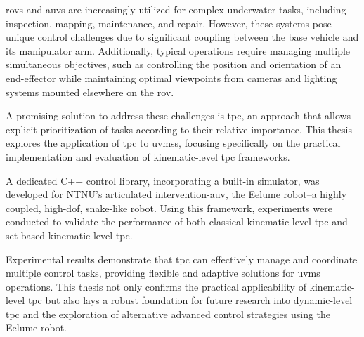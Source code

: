 \Glspl{rov} and \glspl{auv} are increasingly utilized for complex underwater tasks, including inspection, mapping, maintenance, and repair. However, these systems pose unique control challenges due to significant coupling between the base vehicle and its manipulator arm. Additionally, typical operations require managing multiple simultaneous objectives, such as controlling the position and orientation of an end-effector while maintaining optimal viewpoints from cameras and lighting systems mounted elsewhere on the \gls{rov}.

A promising solution to address these challenges is \gls{tpc}, an approach that allows explicit prioritization of tasks according to their relative importance. This thesis explores the application of \gls{tpc} to \glspl{uvms}, focusing specifically on the practical implementation and evaluation of kinematic-level \gls{tpc} frameworks.

A dedicated C++ control library, incorporating a built-in simulator, was developed for NTNU’s articulated intervention-\gls{auv}, the Eelume robot–a highly coupled, high-\gls{dof}, snake-like robot.
Using this framework, experiments were conducted to validate the performance of both classical kinematic-level \gls{tpc} and set-based kinematic-level \gls{tpc}.

Experimental results demonstrate that \gls{tpc} can effectively manage and coordinate multiple control tasks, providing flexible and adaptive solutions for \gls{uvms} operations. This thesis not only confirms the practical applicability of kinematic-level \gls{tpc} but also lays a robust foundation for future research into dynamic-level \gls{tpc} and the exploration of alternative advanced control strategies using the Eelume robot.

